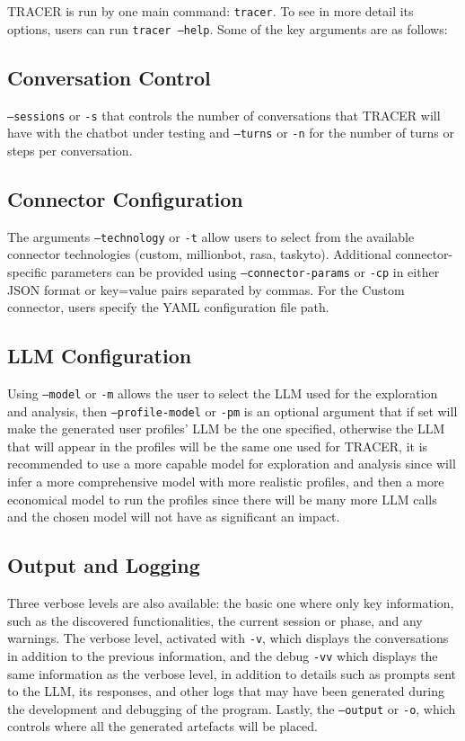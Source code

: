 \ac{TRACER} is run by one main command: \texttt{tracer}.
To see in more detail its options, users can run \texttt{tracer --help}.
Some of the key arguments are as follows:

\subsection{Conversation Control}

\texttt{--sessions} or \texttt{-s} that controls the number of conversations
that \ac{TRACER} will have with the chatbot under testing
and \texttt{--turns} or \texttt{-n} for the number of turns or steps per conversation.

\subsection{Connector Configuration}

The arguments \texttt{--technology} or \texttt{-t} allow users to select
from the available connector technologies (custom, millionbot, rasa, taskyto).
Additional connector-specific parameters can be provided using
\texttt{--connector-params} or \texttt{-cp} in either \ac{JSON} format or key=value pairs
separated by commas.
For the Custom connector, users specify the YAML configuration file path.

\subsection{LLM Configuration}

Using \texttt{--model} or \texttt{-m} allows the user to select the \acl{LLM}
used for the exploration and analysis,
then \texttt{--profile-model} or \texttt{-pm} is an optional argument
that if set will make the generated user profiles' \ac{LLM} be the one specified,
otherwise the \ac{LLM} that will appear in the profiles
will be the same one used for \ac{TRACER},
it is recommended to use a more capable model for exploration and analysis
since will infer a more comprehensive model with more realistic profiles,
and then a more economical model to run the profiles
since there will be many more \ac{LLM} calls
and the chosen model will not have as significant an impact.

\subsection{Output and Logging}

Three verbose levels are also available:
the basic one where only key information, such as the discovered functionalities,
the current session or phase, and any warnings.
The verbose level, activated with \texttt{-v},
which displays the conversations in addition to the previous information,
and the debug \texttt{-vv}
which displays the same information as the verbose level,
in addition to details such as prompts
sent to the \ac{LLM}, its responses,
and other logs that may have been generated
during the development and debugging of the program.
Lastly, the \texttt{--output} or \texttt{-o},
which controls where all the generated artefacts will be placed.

